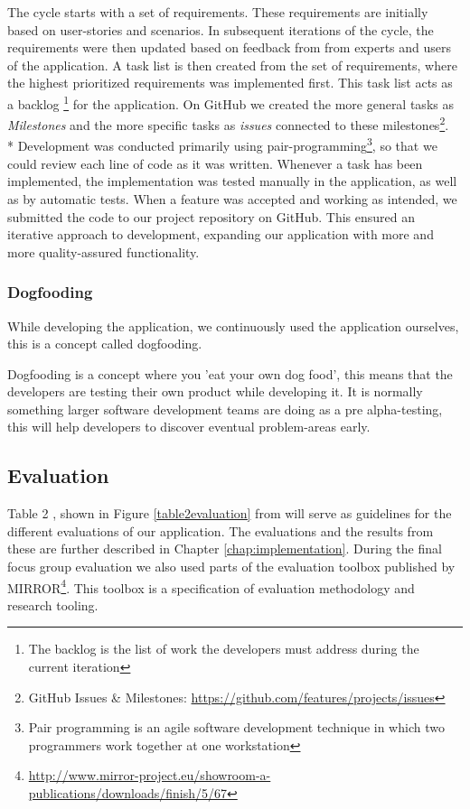 The cycle starts with a set of requirements. These requirements are initially based on user-stories and scenarios. In subsequent iterations of the cycle, the requirements were then updated based on feedback from from experts and users of the application. A task list is then created from the set of requirements, where the highest prioritized requirements was implemented first. This task list acts as a backlog 
\footnote{The backlog is the list of work the developers must address during the current iteration} for the application. On GitHub we created the more general tasks as \emph{Milestones} and the more specific tasks as \emph{issues} connected to these milestones\footnote{GitHub Issues \& Milestones: \url{https://github.com/features/projects/issues}}.\\* Development was conducted primarily using pair-programming\footnote{Pair programming is an agile software development technique in which two programmers work together at one workstation}, so that we could review each line of code as it was written. Whenever a task has been implemented, the implementation was tested manually in the application, as well as by automatic tests. When a feature was accepted and working as intended, we submitted the code to our project repository on GitHub.
This ensured an iterative approach to development, expanding our application with more and more quality-assured functionality. 

\subsubsection*{Dogfooding}
\label{dogfooding}
While developing the application, we continuously used the application ourselves, this is a concept called dogfooding.

Dogfooding is a concept where you 'eat your own dog food', this means that the developers are testing their own product while developing it\citep{dogfooding}. It is normally something larger software development teams are doing as a pre alpha-testing, this will help developers to discover eventual problem-areas early.

\subsection{Evaluation} 
Table 2 , shown in Figure \ref{table2evaluation} from \citep{Esearch2004} will serve as guidelines for the different evaluations of our application. The evaluations and the results from these are further described in Chapter \ref{chap:implementation}. During the final focus group evaluation we also used parts of the evaluation toolbox published by MIRROR\footnote{\url{http://www.mirror-project.eu/showroom-a-publications/downloads/finish/5/67}}. This toolbox is a specification of evaluation methodology and research tooling. 

